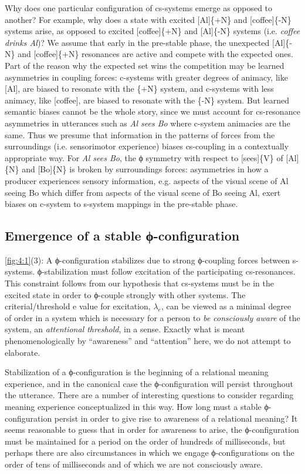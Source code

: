   Why does one particular configuration of cs-systems emerge as opposed to another? For example, why does a state with excited [Al]\{+N\} and [coffee]\{-N\} systems arise, as opposed to excited [coffee]\{+N\} and [Al]\{-N\} systems (i.e. \textit{coffee drinks Al})? We assume that early in the pre-stable phase, the unexpected [Al]\{-N\} and [coffee]\{+N\} resonances are active and compete with the expected ones. Part of the reason why the expected set wins the competition may be learned asymmetries in coupling forces: c-systems with greater degrees of animacy, like [Al], are biased to resonate with the \{+N\} system, and c-systems with less animacy, like [coffee], are biased to resonate with the \{-N\} system. But learned semantic biases cannot be the whole story, since we must account for cs-resonance asymmetries in utterances such as \textit{Al sees Bo} where c-system animacies are the same. Thus we presume that information in the patterns of forces from the surroundings (i.e. sensorimotor experience) biases cs-coupling in a contextually appropriate way. For \textit{Al sees Bo}, the ϕ symmetry with respect to [sees]\{V\} of [Al]\{N\} and [Bo]\{N\} is broken by surroundings forces: asymmetries in how a producer experiences sensory information, e.g. aspects of the visual scene of Al seeing Bo which differ from aspects of the visual scene of Bo seeing Al, exert biases on c-system to s-system mappings in the pre-stable phase.

\subsection{Emergence of a stable ϕ-configuration}

\ref{fig:4:1}(3): A ϕ-configuration stabilizes due to strong ϕ{}-coupling forces between s-systems. ϕ{}-stabilization must follow excitation of the participating cs-resonances. This constraint follows from our hypothesis that cs-systems must be in the excited state in order to ϕ-couple strongly with other systems. The criterial/threshold e value for excitation, $\lambda_{e}$, can be viewed as a minimal degree of order in a system which is necessary for a person to \textit{be consciously aware} of the system, an \textit{attentional threshold}, in a sense. Exactly what is meant phenomenologically by “awareness” and “attention” here, we do not attempt to elaborate. 

   Stabilization of a ϕ-configuration is the beginning of a relational meaning experience, and in the canonical case the ϕ-configuration will persist throughout the utterance. There are a number of interesting questions to consider regarding meaning experience conceptualized in this way. How long must a stable ϕ-configuration persist in order to give rise to awareness of a relational meaning? It seems reasonable to guess that in order for awareness to arise, the ϕ-configuration must be maintained for a period on the order of hundreds of milliseconds, but perhaps there are also circumstances in which we engage ϕ-configurations on the order of tens of milliseconds and of which we are not consciously aware.

